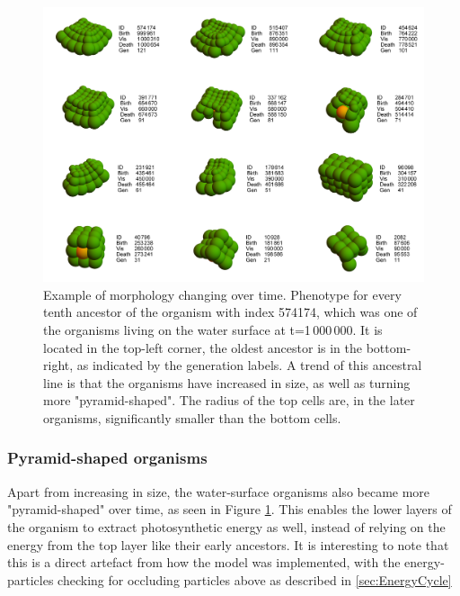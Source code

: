 
\begin{figure}
  \begin{center}
  \includegraphics[width=\textwidth]{figure/increasingSize}
  \caption{
  Example of morphology changing over time. Phenotype for every tenth ancestor of the organism with index 574174, which was one of the organisms living on the water surface at t=1\,000\,000. It is located in the top-left corner, the oldest ancestor is in the bottom-right, as indicated by the generation labels. A trend of this ancestral line is that the organisms have increased in size, as well as turning more "pyramid-shaped". The radius of the top cells are, in the later organisms, significantly smaller than the bottom cells.
  }
  \label{fig:increasingSize}
  \end{center}
\end{figure}

\subsubsection{Pyramid-shaped organisms}
Apart from increasing in size, the water-surface organisms also became more "pyramid-shaped" over time, as seen in Figure \ref{fig:increasingSize}. This enables the lower layers of the organism to extract photosynthetic energy as well, instead of relying on the energy from the top layer like their early ancestors. It is interesting to note that this is a direct artefact from how the model was implemented, with the energy-particles checking for occluding particles above as described in \ref{sec:EnergyCycle}

